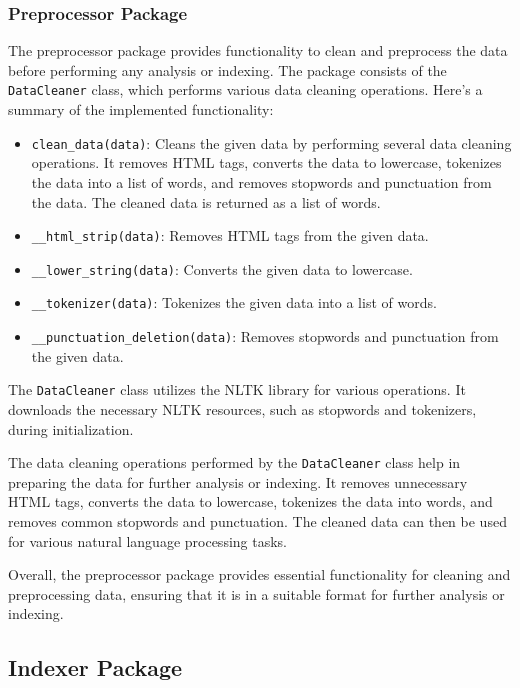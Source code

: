 \documentclass{article}
\begin{document}
\subsubsection{Preprocessor Package}

The preprocessor package provides functionality to clean and preprocess the data before performing any analysis or indexing. The package consists of the \texttt{DataCleaner} class, which performs various data cleaning operations. Here's a summary of the implemented functionality:

\begin{itemize}
    \item \texttt{clean\_data(data)}: Cleans the given data by performing several data cleaning operations. It removes HTML tags, converts the data to lowercase, tokenizes the data into a list of words, and removes stopwords and punctuation from the data. The cleaned data is returned as a list of words.
    \item \texttt{\_\_html\_strip(data)}: Removes HTML tags from the given data.
    \item \texttt{\_\_lower\_string(data)}: Converts the given data to lowercase.
    \item \texttt{\_\_tokenizer(data)}: Tokenizes the given data into a list of words.
    \item \texttt{\_\_punctuation\_deletion(data)}: Removes stopwords and punctuation from the given data.
\end{itemize}

The \texttt{DataCleaner} class utilizes the NLTK library for various operations. It downloads the necessary NLTK resources, such as stopwords and tokenizers, during initialization.

The data cleaning operations performed by the \texttt{DataCleaner} class help in preparing the data for further analysis or indexing. It removes unnecessary HTML tags, converts the data to lowercase, tokenizes the data into words, and removes common stopwords and punctuation. The cleaned data can then be used for various natural language processing tasks.

Overall, the preprocessor package provides essential functionality for cleaning and preprocessing data, ensuring that it is in a suitable format for further analysis or indexing.

\subsection{Indexer Package}
\end{document}
